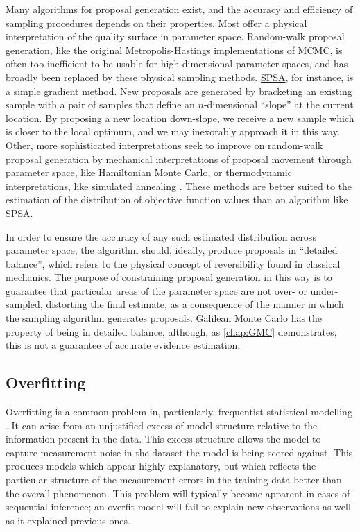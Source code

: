 \documentclass{ut-thesis}
\begin{document}
\begin{NoHyper}
Many algorithms for proposal generation exist, and the accuracy and efficiency of sampling procedures depends on their properties. Most offer a physical interpretation of the quality surface in parameter space. Random-walk proposal generation, like the original Metropolis-Hastings implementations of MCMC, is often too inefficient to be usable for high-dimensional parameter spaces, and has broadly been replaced by these physical sampling methods. \hyperref[ssec:SPSA]{SPSA}, for instance, is a simple gradient method. New proposals are generated by bracketing an existing sample with a pair of samples that define an $n$-dimensional ``slope'' at the current location. By proposing a new location down-slope, we receive a new sample which is closer to the local optimum, and we may inexorably approach it in this way. Other, more sophisticated interpretations seek to improve on random-walk proposal generation by mechanical interpretations of proposal movement through parameter space, like Hamiltonian Monte Carlo, or thermodynamic interpretations, like simulated annealing \cite{Andrieu2010}. These methods are better suited to the estimation of the distribution of objective function values than an algorithm like SPSA.

In order to ensure the accuracy of any such estimated distribution across parameter space, the algorithm should, ideally, produce proposals in ``detailed balance'', which refers to the physical concept of reversibility found in classical mechanics. The purpose of constraining proposal generation in this way is to guarantee that particular areas of the parameter space are not over- or under-sampled, distorting the final estimate, as a consequence of the manner in which the sampling algorithm generates proposals. \hyperref[ssec:GMC]{Galilean Monte Carlo} has the property of being in detailed balance, although, as \autoref{chap:GMC} demonstrates, this is not a guarantee of accurate evidence estimation.

\subsection{Overfitting}
\label{ssec:overfit}
Overfitting is a common problem in, particularly, frequentist statistical modelling \cite[p.9-11]{Bishop2006}. It can arise from an unjustified excess of model structure relative to the information present in the data. This excess structure allows the model to capture measurement noise in the dataset the model is being scored against. This produces models which appear highly explanatory, but which reflects the particular structure of the measurement errors in the training data better than the overall phenomenon. This problem will typically become apparent in cases of sequential inference; an overfit model will fail to explain new observations as well as it explained previous ones.


\end{NoHyper}
\end{document}
